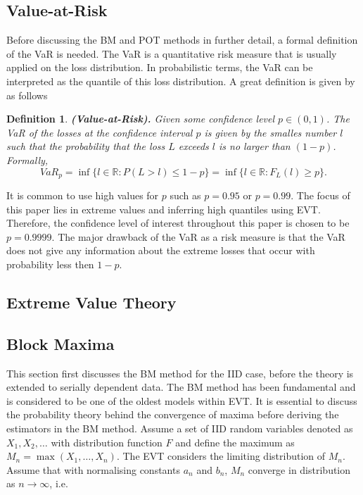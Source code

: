 \documentclass[a4paper,12pt]{article}
\theoremstyle{plain}
\newtheorem{mydef}{Definition}
\begin{document}
\subsection{Value-at-Risk}
Before discussing the BM and POT methods in further detail, a formal definition of the VaR is needed. The VaR is a quantitative risk measure that is usually applied on the loss distribution. In probabilistic terms, the VaR can be interpreted as the quantile of this loss distribution. A great definition is given by  as follows
\begin{mydef}{\textbf{(Value-at-Risk).}}
    Given some confidence level $p \in \left(0,1\right)$. The VaR of the losses at the confidence interval $p$ is given by the smalles number $l$ such that the probability that the loss $L$ exceeds $l$ is no larger than $\left(1-p\right)$. Formally, 
    \begin{equation}
        VaR_p=\inf\{l\in\mathbb{R}: P\left(L>l\right)\leq 1-p\}=\inf\{l\in\mathbb{R}: F_L\left(l\right)\geq p\}.
    \end{equation}
\end{mydef}
\noindent It is common to use high values for $p$ such as $p=0.95$ or $p=0.99$. The focus of this paper lies in extreme values and inferring high quantiles using EVT. Therefore, the confidence level of interest throughout this paper is chosen to be $p=0.9999$. The major drawback of the VaR as a risk measure is that the VaR does not give any information about the extreme losses that occur with probability less then $1-p$.

\subsection{Extreme Value Theory}

\subsection{Block Maxima}
This section first discusses the BM method for the IID case, before the theory is extended to serially dependent data. The BM method has been fundamental and is considered to be one of the oldest models within EVT. It is essential to discuss the probability theory behind the convergence of maxima before deriving the estimators in the BM method. Assume a set of IID random variables denoted as $X_1, X_2, \dots$ with distribution function $F$ and define the maximum as $M_n=\max\left(X_1, \dots, X_n\right)$. The EVT considers the limiting distribution of $M_n$. Assume that with normalising constants $a_n$ and $b_n$, $M_n$ converge in distribution as $n\to \infty$, i.e.
\end{document}
